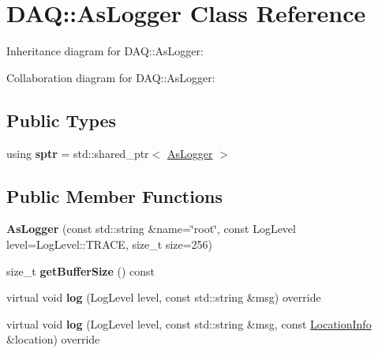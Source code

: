\hypertarget{classDAQ_1_1AsLogger}{}\section{D\+AQ\+:\+:As\+Logger Class Reference}
\label{classDAQ_1_1AsLogger}


Inheritance diagram for D\+AQ\+:\+:As\+Logger\+:


Collaboration diagram for D\+AQ\+:\+:As\+Logger\+:
\subsection*{Public Types}
\begin{DoxyCompactItemize}
\item 
\mbox{\label{classDAQ_1_1AsLogger_a6e542f8cacc0b5855053ddb3f3bd4ded}} 
using {\bfseries sptr} = std\+::shared\+\_\+ptr$<$ \hyperlink{classDAQ_1_1AsLogger}{As\+Logger} $>$
\end{DoxyCompactItemize}
\subsection*{Public Member Functions}
\begin{DoxyCompactItemize}
\item 
\mbox{\label{classDAQ_1_1AsLogger_a93e985bccdbc8cd33ea8942428006e55}} 
{\bfseries As\+Logger} (const std\+::string \&name=\char`\"{}root\char`\"{}, const Log\+Level level=Log\+Level\+::\+T\+R\+A\+CE, size\+\_\+t size=256)
\item 
\mbox{\label{classDAQ_1_1AsLogger_a4c1db9ad5e4339eb85039bcb924dacae}} 
size\+\_\+t {\bfseries get\+Buffer\+Size} () const
\item 
\mbox{\label{classDAQ_1_1AsLogger_a99137266d36c48b9bf8ac81579ab95d9}} 
virtual void {\bfseries log} (Log\+Level level, const std\+::string \&msg) override
\item 
\mbox{\label{classDAQ_1_1AsLogger_a999896d08d961f3789a157fa2c2eebd6}} 
virtual void {\bfseries log} (Log\+Level level, const std\+::string \&msg, const \hyperlink{classDAQ_1_1LocationInfo}{Location\+Info} \&location) override
\end{DoxyCompactItemize}

